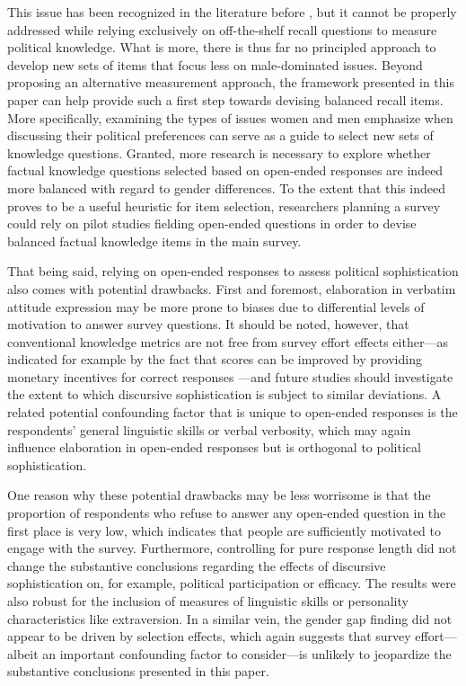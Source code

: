 This issue has been recognized in the literature before \citep[e.g.,][]{graber2001processing,dolan2011women}, but it cannot be properly addressed while relying exclusively on off-the-shelf recall questions to measure political knowledge. What is more, there is thus far no principled approach to develop new sets of items that focus less on male-dominated issues. Beyond proposing an alternative measurement approach, the framework presented in this paper can help provide such a first step towards devising balanced recall items. More specifically, examining the types of issues women and men emphasize when discussing their political preferences can serve as a guide to select new sets of knowledge questions. Granted, more research is necessary to explore whether factual knowledge questions selected based on open-ended responses are indeed more balanced with regard to gender differences. To the extent that this indeed proves to be a useful heuristic for item selection, researchers planning a survey could rely on pilot studies fielding open-ended questions in order to devise balanced factual knowledge items in the main survey.

That being said, relying on open-ended responses to assess political sophistication also comes with potential drawbacks. First and foremost, elaboration in verbatim attitude expression may be more prone to biases due to differential levels of motivation to answer survey questions. It should be noted, however, that conventional knowledge metrics are not free from survey effort effects either---as indicated for example by the fact that scores can be improved by providing monetary incentives for correct responses \citep{prior2008money}---and future studies should investigate the extent to which discursive sophistication is subject to similar deviations. A related potential confounding factor that is unique to open-ended responses is the respondents' general linguistic skills or verbal verbosity, which may again influence elaboration in open-ended responses but is orthogonal to political sophistication.

One reason why these potential drawbacks may be less worrisome is that the proportion of respondents who refuse to answer any open-ended question in the first place is very low, which indicates that people are sufficiently motivated to engage with the survey. Furthermore, controlling for pure response length did not change the substantive conclusions regarding the effects of discursive sophistication on, for example, political participation or efficacy. The results were also robust for the inclusion of measures of linguistic skills or personality characteristics like extraversion. In a similar vein, the gender gap finding did not appear to be driven by selection effects, which again suggests that survey effort---albeit an important confounding factor to consider---is unlikely to jeopardize the substantive conclusions presented in this paper.

